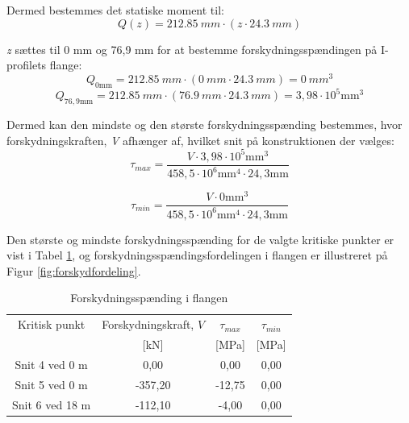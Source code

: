 Dermed bestemmes det statiske moment til:
\begin{equation}
Q(z) = \SI{212,85}{mm} \cdot (z \cdot \SI{24,3}{mm})
\end{equation}

\textit{z} sættes til 0 mm og 76,9 mm for at bestemme forskydningsspændingen på I-profilets flange:
\begin{equation}
Q_{0 \text{mm}} = \SI{212,85}{mm} \cdot (\SI{0}{mm} \cdot \SI{24,3}{mm}) = \SI{0}{mm^3}
\end{equation} 
\begin{equation}
	Q_{76,9 \text{mm}} = \SI{212,85}{mm} \cdot (\SI{76,9}{mm} \cdot \SI{24,3}{mm}) =  3,\!98 \cdot 10^5 \text{mm}^3 
\end{equation}

Dermed kan den mindste og den største forskydningsspænding bestemmes, hvor forskydningskraften, \textit{V} afhænger af, hvilket snit på konstruktionen der vælges:
\begin{equation}
	\tau_{max} = \frac{V \cdot 3,98 \cdot 10^5 \text{mm}^3}{458,\!5 \cdot 10^6 \text{mm}^4 \cdot 24,\!3 \text{mm}}
\end{equation}

\begin{equation}
	\tau_{min} = \frac{V \cdot 0 \text{mm}^3}{458,\!5 \cdot 10^6 \text{mm}^4 \cdot 24,\!3 \text{mm}}
\end{equation}

Den største og mindste forskydningsspænding for de valgte kritiske punkter er vist i Tabel \ref{tab:forskudning}, og forskydningsspændingsfordelingen i flangen er illustreret på Figur \ref{fig:forskydfordeling}.

\begin{table} [H]
	\begin{center}
		\begin{tabular}{c c c c }
			\hline
			Kritisk punkt   & Forskydningskraft, $V$ & $\tau_{max}$ & $\tau_{min}$ \\ 
			& [kN] & [MPa] & [MPa]
			\\ \hline
			Snit 4 ved 0 m  & 0,00                       & 0,00              & 0,00                     \\ \hline
			Snit 5 ved 0 m  & -357,20                 & -12,75         & 0,00                     \\ \hline
			Snit 6 ved 18 m & -112,10                 & -4,00          & 0,00                     \\ \hline
		\end{tabular}
		\caption{Forskydningsspænding i flangen}
		\label{tab:forskudning}
	\end{center}
\end{table}


